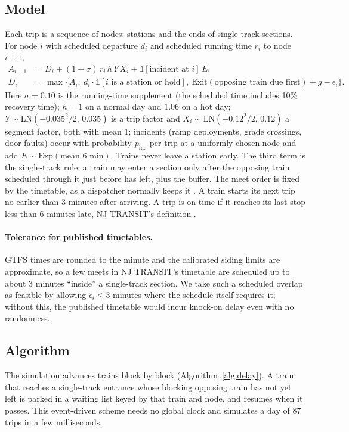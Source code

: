 \documentclass[11pt]{article}
\begin{document}
\subsection{Model}
Each trip is a sequence of nodes: stations and the ends of single-track sections. For node $i$ with scheduled departure $d_i$ and scheduled running time $r_i$ to node $i+1$,
\begin{align}
A_{i+1}&=D_i+(1-\sigma)\,r_i\,h\,Y\,X_i+\mathbb{1}[\text{incident at }i]\,E, \label{eq:run}\\
D_i&=\max\bigl\{A_i,\ d_i\cdot\mathbb{1}[i\text{ is a station or hold}],\ \text{Exit}(\text{opposing train due first})+g-\epsilon_i\bigr\}. \label{eq:dep}
\end{align}
Here $\sigma=0.10$ is the running-time supplement (the scheduled time includes 10\% recovery time); $h=1$ on a normal day and $1.06$ on a hot day; $Y\sim\mathrm{LN}(-0.035^2/2,\,0.035)$ is a trip factor and $X_i\sim\mathrm{LN}(-0.12^2/2,\,0.12)$ a segment factor, both with mean 1; incidents (ramp deployments, grade crossings, door faults) occur with probability $p_{\text{inc}}$ per trip at a uniformly chosen node and add $E\sim\mathrm{Exp}(\text{mean }6\text{ min})$. Trains never leave a station early. The third term is the single-track rule: a train may enter a section only after the opposing train scheduled through it just before has left, plus the buffer. The meet order is fixed by the timetable, as a dispatcher normally keeps it \citep{carey1995model,higgins1996optimal}. A train starts its next trip no earlier than 3 minutes after arriving. A trip is on time if it reaches its last stop less than 6 minutes late, NJ TRANSIT's definition \citep{njt2019otp}.

\paragraph{Tolerance for published timetables.} GTFS times are rounded to the minute and the calibrated siding limits are approximate, so a few meets in NJ TRANSIT's timetable are scheduled up to about 3 minutes ``inside'' a single-track section. We take such a scheduled overlap as feasible by allowing $\epsilon_i\le 3$ minutes where the schedule itself requires it; without this, the published timetable would incur knock-on delay even with no randomness.

\subsection{Algorithm}
The simulation advances trains block by block (Algorithm~\ref{alg:delay}). A train that reaches a single-track entrance whose blocking opposing train has not yet left is parked in a waiting list keyed by that train and node, and resumes when it passes. This event-driven scheme needs no global clock and simulates a day of 87 trips in a few milliseconds.
\end{document}
